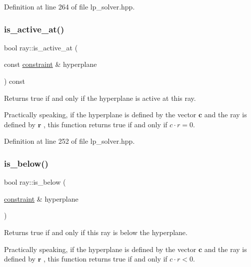 Definition at line 264 of file lp\+\_\+solver.\+hpp.

\mbox{\label{classray_aa1831b718c9a91d786a1a578cb1cefea}} 
\subsubsection{\texorpdfstring{is\+\_\+active\+\_\+at()}{is\_active\_at()}}
{\footnotesize\ttfamily bool ray\+::is\+\_\+active\+\_\+at (\begin{DoxyParamCaption}\item[{const \hyperlink{classconstraint}{constraint} \&}]{hyperplane }\end{DoxyParamCaption}) const\hspace{0.3cm}{\ttfamily [inline]}}



Returns {\ttfamily true} if and only if the hyperplane is active at this ray. 

Practically speaking, if the hyperplane is defined by the vector $ \mathbf c $ and the ray is defined by $ \mathbf r $ , this function returns true if and only if $ c\cdot r = 0 $. 

Definition at line 252 of file lp\+\_\+solver.\+hpp.

\mbox{\label{classray_a08f0af168bb0a86db612fdd3ce22045b}} 
\subsubsection{\texorpdfstring{is\+\_\+below()}{is\_below()}}
{\footnotesize\ttfamily bool ray\+::is\+\_\+below (\begin{DoxyParamCaption}\item[{\hyperlink{classconstraint}{constraint} \&}]{hyperplane }\end{DoxyParamCaption})\hspace{0.3cm}{\ttfamily [inline]}}



Returns {\ttfamily true} if and only if this ray is below the hyperplane. 

Practically speaking, if the hyperplane is defined by the vector $ \mathbf c $ and the ray is defined by $ \mathbf r $ , this function returns true if and only if $ c\cdot r < 0 $. 

